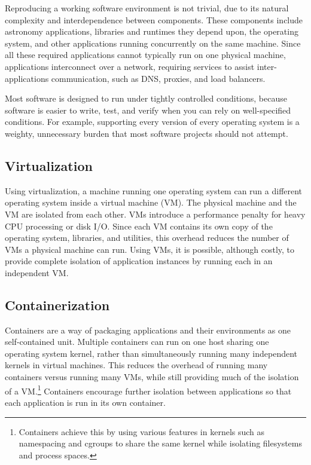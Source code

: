 \documentclass[11pt,twoside]{article}
\begin{document}
Reproducing a working software environment is not trivial, due to
its natural complexity and interdependence between components.  These components
include astronomy applications, libraries and runtimes they depend upon, the 
operating system, and other applications running concurrently on the same machine.
Since all these required applications cannot
typically run on one physical machine, applications interconnect over a network,
requiring services to assist inter-applications communication, such as DNS, proxies,
and load balancers.

Most software is designed to run under tightly controlled conditions, because
software is easier to write, test, and verify when you can rely on
well-specified conditions.  For example, supporting every version of every
operating system is a weighty, unnecessary burden that most software projects
should not attempt.

\subsection{Virtualization}

Using virtualization, a machine running one operating system can run a different 
operating system inside a virtual machine (VM).  The physical machine and the VM
are isolated from each other.   VMs introduce a performance penalty for heavy CPU
processing or disk I/O.  Since each VM contains its own copy of the operating
system, libraries, and utilities, this overhead reduces the number of VMs a physical machine
can run.  Using VMs, it is possible, although costly, to provide complete isolation of
application instances by running each in an independent VM.

\subsection{Containerization}

Containers are a way of packaging applications and their environments as one self-contained unit.
Multiple containers can run on one host sharing one operating system kernel, rather than simultaneously
running many independent kernels in virtual machines.  This reduces the overhead of running many containers
versus running many VMs, while still providing much of the isolation of a VM.\footnote{Containers
achieve this by using various features in kernels such as namespacing and cgroups
to share the same kernel while isolating filesystems and process spaces.}  Containers
encourage further isolation between applications so that each application is run in its
own container.
\end{document}
